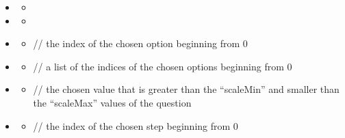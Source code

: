\documentclass[a4paper]{scrreprt}
\begin{document}
\begin{itemize}
                    \item {}
                        \begin{itemize}
                            \item {}
                        \end{itemize}

                   \item {}
                       \begin{itemize}
                           \item {}
                       \end{itemize}

                    \item {}
                        \begin{itemize}
                            \item {}
                                \par // the index of the chosen option beginning from 0
                        \end{itemize}
                        
                   \item {}
                       \begin{itemize}
                           \item {}
                               \par // a list of the indices of the chosen options beginning from 0
                       \end{itemize}
                       
                    \item {}
                        \begin{itemize}
                            \item {}
                                \par // the chosen value that is greater than the “scaleMin” and smaller than the “scaleMax” values of the question
                        \end{itemize}
                        
                    \item {}
                        \begin{itemize}
                            \item {}
                                \par // the index of the chosen step beginning from 0
                        \end{itemize}

            \end{itemize}
\end{document}
